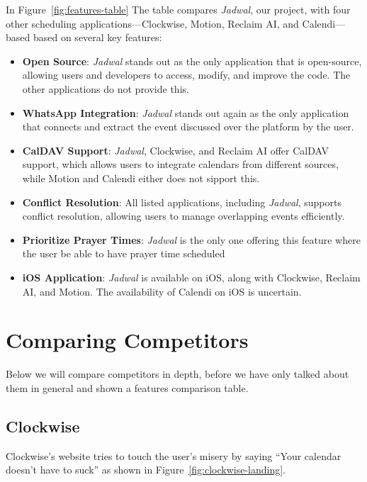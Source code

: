 \documentclass[12pt,a4paper]{report}
\begin{document}
\newpage

In Figure~\ref{fig:features-table} The table compares \textit{Jadwal}, our project, with four other scheduling applications—Clockwise, Motion, Reclaim AI, and Calendi—based based on several key features:
\begin{itemize}
    \item \textbf{Open Source}: \textit{Jadwal} stands out as the only application that is open-source, allowing users and developers to access, modify, and improve the code. The other applications do not provide this.
    \item \textbf{WhatsApp Integration}: \textit{Jadwal} stands out again as the only application that connects and extract the event discussed over the platform by the user.
    \item \textbf{CalDAV Support}: \textit{Jadwal}, Clockwise, and Reclaim AI offer CalDAV support, which allows users to integrate calendars from different sources, while Motion and Calendi either does not sipport this.
    \item \textbf{Conflict Resolution}: All listed applications, including \textit{Jadwal}, supports conflict resolution, allowing users to manage overlapping events efficiently.
    \item \textbf{Prioritize Prayer Times}: \textit{Jadwal} is the only one offering this feature where the user be able to have prayer time scheduled
    \item \textbf{iOS Application}: \textit{Jadwal} is available on iOS, along with Clockwise, Reclaim AI, and Motion. The availability of Calendi on iOS is uncertain.
\end{itemize}

\section{Comparing Competitors}

Below we will compare competitors in depth, before we have only talked about them in general and shown a features comparison table.

\subsection{Clockwise}

Clockwise's website tries to touch the user's misery by saying ``Your calendar doesn't have to suck'' as shown in Figure~\ref{fig:clockwise-landing}.
\end{document}
